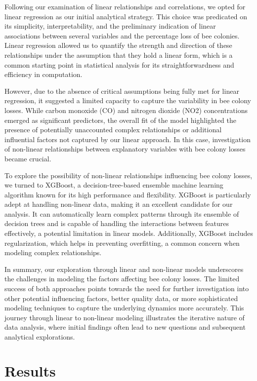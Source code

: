 \documentclass[
  letterpaper,
  DIV=11,
  numbers=noendperiod]{scrartcl}
\begin{document}
Following our examination of linear relationships and correlations, we
opted for linear regression as our initial analytical strategy. This
choice was predicated on its simplicity, interpretability, and the
preliminary indication of linear associations between several variables
and the percentage loss of bee colonies. Linear regression allowed us to
quantify the strength and direction of these relationships under the
assumption that they hold a linear form, which is a common starting
point in statistical analysis for its straightforwardness and efficiency
in computation.

However, due to the absence of critical assumptions being fully met for
linear regression, it suggested a limited capacity to capture the
variability in bee colony losses. While carbon monoxide (CO) and
nitrogen dioxide (NO2) concentrations emerged as significant predictors,
the overall fit of the model highlighted the presence of potentially
unaccounted complex relationships or additional influential factors not
captured by our linear approach. In this case, investigation of
non-linear relationships between explanatory variables with bee colony
losses became crucial.

To explore the possibility of non-linear relationships influencing bee
colony losses, we turned to XGBoost, a decision-tree-based ensemble
machine learning algorithm known for its high performance and
flexibility. XGBoost is particularly adept at handling non-linear data,
making it an excellent candidate for our analysis. It can automatically
learn complex patterns through its ensemble of decision trees and is
capable of handling the interactions between features effectively, a
potential limitation in linear models. Additionally, XGBoost includes
regularization, which helps in preventing overfitting, a common concern
when modeling complex relationships.

In summary, our exploration through linear and non-linear models
underscores the challenges in modeling the factors affecting bee colony
losses. The limited success of both approaches points towards the need
for further investigation into other potential influencing factors,
better quality data, or more sophisticated modeling techniques to
capture the underlying dynamics more accurately. This journey through
linear to non-linear modeling illustrates the iterative nature of data
analysis, where initial findings often lead to new questions and
subsequent analytical explorations.

\section{Results}\label{results}
\end{document}
